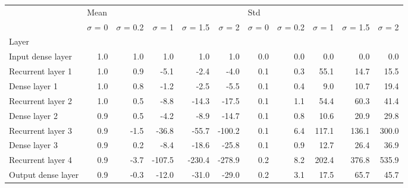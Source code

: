 \begin{tabular}{lrrrrrrrrrr}
\toprule
{} & \multicolumn{5}{l}{Mean} & \multicolumn{5}{l}{Std} \\
{} & $\sigma$  = 0 & $\sigma$  = 0.2 & $\sigma$  = 1 & $\sigma$  = 1.5 & $\sigma$  = 2 & $\sigma$  = 0 & $\sigma$  = 0.2 & $\sigma$  = 1 & $\sigma$  = 1.5 & $\sigma$  = 2 \\
Layer              &               &                 &               &                 &               &               &                 &               &                 &               \\
\midrule
Input dense layer  &           1.0 &             1.0 &           1.0 &             1.0 &           1.0 &           0.0 &             0.0 &           0.0 &             0.0 &           0.0 \\
Recurrent layer 1  &           1.0 &             0.9 &          -5.1 &            -2.4 &          -4.0 &           0.1 &             0.3 &          55.1 &            14.7 &          15.5 \\
Dense layer 1      &           1.0 &             0.8 &          -1.2 &            -2.5 &          -5.5 &           0.1 &             0.4 &           9.0 &            10.7 &          19.4 \\
Recurrent layer 2  &           1.0 &             0.5 &          -8.8 &           -14.3 &         -17.5 &           0.1 &             1.1 &          54.4 &            60.3 &          41.4 \\
Dense layer 2      &           0.9 &             0.5 &          -4.2 &            -8.9 &         -14.7 &           0.1 &             0.8 &          10.6 &            20.9 &          29.8 \\
Recurrent layer 3  &           0.9 &            -1.5 &         -36.8 &           -55.7 &        -100.2 &           0.1 &             6.4 &         117.1 &           136.1 &         300.0 \\
Dense layer 3      &           0.9 &             0.2 &          -8.4 &           -18.6 &         -25.8 &           0.1 &             0.9 &          12.7 &            26.4 &          36.9 \\
Recurrent layer 4  &           0.9 &            -3.7 &        -107.5 &          -230.4 &        -278.9 &           0.2 &             8.2 &         202.4 &           376.8 &         535.9 \\
Output dense layer &           0.9 &            -0.3 &         -12.0 &           -31.0 &         -29.0 &           0.2 &             3.1 &          17.5 &            65.7 &          45.7 \\
\bottomrule
\end{tabular}
